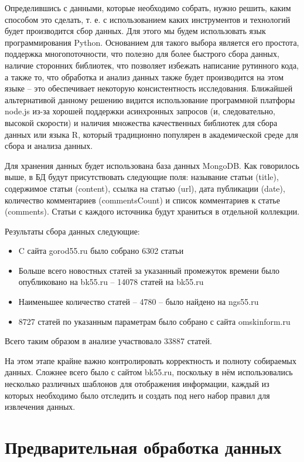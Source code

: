 Определившись с данными, которые необходимо собрать, нужно решить, каким способом это сделать, т. е. с использованием каких инструментов и технологий будет производится сбор данных. Для этого мы будем использовать язык программирования Python. Основанием для такого выбора является его простота, поддержка многопоточности, что полезно для более быстрого сбора данных, наличие сторонних библиотек, что позволяет избежать написание рутинного кода, а также то, что обработка и анализ данных также будет производится на этом языке -- это обеспечивает некоторую консистентность исследования. Ближайшей альтернативой данному решению видится использование программной платфоры node.js из-за хорошей поддержки асинхронных запросов (и, следовательно, высокой скорости) и наличия множества качественных библиотек для сбора данных или языка R, который традиционно популярен в академической среде для сбора и анализа данных.

Для хранения данных будет использована база данных MongoDB. Как говорилось выше, в БД будут присутствовать следующие поля: называние статьи (title), содержимое статьи (content), ссылка на статью (url), дата публикации (date), количество комментариев (commentsCount) и список комментариев к статье (comments). Статьи с каждого источника будут храниться в отдельной коллекции.

Результаты сбора данных следующие:
\begin{itemize}
\item C сайта gorod55.ru было собрано 6302 статьи
\item Больше всего новостных статей за указанный промежуток времени было опубликовано на bk55.ru -- 14078 статей  на bk55.ru
\item Наименьшее количество статей -- 4780 -- было найдено на ngs55.ru
\item 8727 статей по указанным параметрам было собрано с сайта omskinform.ru
\end{itemize}

Всего таким образом в анализе участвовало 33887 статей.

На этом этапе крайне важно контролировать корректность и полноту собираемых данных. Сложнее всего было с сайтом bk55.ru, поскольку в нём использовались несколько различных шаблонов для отображения информации, каждый из которых необходимо было отследить и создать под него набор правил для извлечения данных.

\section{Предварительная обработка данных} \label{sect2_3}

